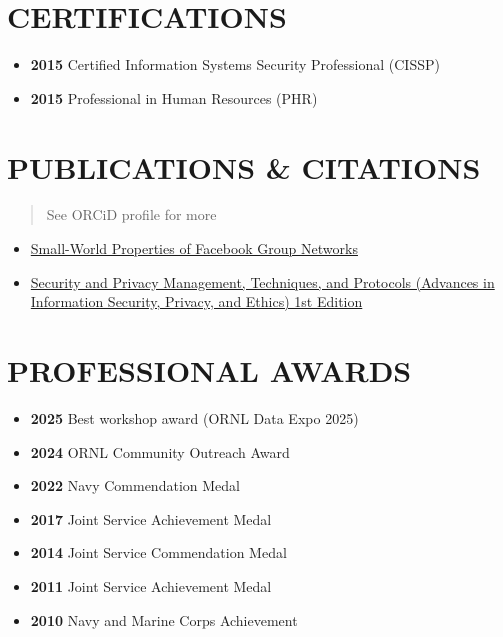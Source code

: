 \documentclass[10pt]{article}
\def\tightlist{}
\begin{document}
\section{CERTIFICATIONS}\label{certifications}

\begin{itemize}
\tightlist
\item
  \textbf{2015} Certified Information Systems Security Professional
  (CISSP)
\item
  \textbf{2015} Professional in Human Resources (PHR)
\end{itemize}

\section{PUBLICATIONS \& CITATIONS}\label{publications-citations}

\begin{quote}
See ORCiD profile for more
\end{quote}

\begin{itemize}
\tightlist
\item
  \href{http://wpmedia.wolfram.com/uploads/sites/13/2018/02/23-3-1.pdf}{Small-World
  Properties of Facebook Group Networks}
\item
  \href{https://smile.amazon.com/gp/product/1522555838/ref=ppx_yo_dt_b_asin_title_o02_s00?ie=UTF8&psc=1}{Security
  and Privacy Management, Techniques, and Protocols (Advances in
  Information Security, Privacy, and Ethics) 1st Edition}
\end{itemize}

\section{PROFESSIONAL AWARDS}\label{professional-awards}

\begin{itemize}
\tightlist
\item
  \textbf{2025} Best workshop award (ORNL Data Expo 2025)
\item
  \textbf{2024} ORNL Community Outreach Award
\item
  \textbf{2022} Navy Commendation Medal
\item
  \textbf{2017} Joint Service Achievement Medal
\item
  \textbf{2014} Joint Service Commendation Medal
\item
  \textbf{2011} Joint Service Achievement Medal
\item
  \textbf{2010} Navy and Marine Corps Achievement
\end{itemize}
\end{document}
